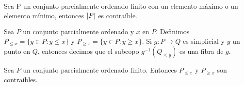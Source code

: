 \begin{Col}
Sea P un conjunto parcialmente ordenado finito con un elemento máximo o un elemento mínimo, entonces $\left| P \right|$ es contraíble.
\end{Col}

\begin{Defi}
Sea $P$ un conjunto parcialmente ordenado y $x$ en $P$. Definimos $P_{\leqslant x} = \{y\in P : y\leqslant x\}$ y $P_{\geqslant x} = \{y\in P : y\geqslant x\}$. Si $g\colon P \rightarrow Q$ es simplicial y $y$ un punto en $Q$, entonces decimos que el subcopo $g^{-1}(Q_{\leqslant y})$ es una fibra de $g$.
\end{Defi}

\begin{Col}
Sea $P$ un conjunto parcialmente ordenado finito. Entonces $P_{\leqslant x}$ y $P_{\geqslant x}$ son contraíbles.
\end{Col}

\begin{Teo}

\end{Teo}


